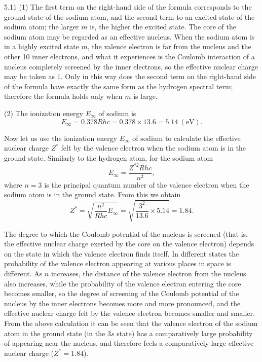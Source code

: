 \begin{solution}{5.11}
(1) The first term on the right-hand side of the formula corresponds to the ground state of the
sodium atom, and the second term to an excited state of the sodium atom; the larger $m$ is, the
higher the excited state. The core of the sodium atom may be regarded as an effective nucleus.
When the sodium atom is in a highly excited state $m$, the valence electron is far from the
nucleus and the other 10 inner electrons, and what it experiences is the Coulomb interaction of
a nucleus completely screened by the inner electrons, so the effective nuclear charge may be
taken as 1. Only in this way does the second term on the right-hand side of the formula have
exactly the same form as the hydrogen spectral term; therefore the formula holds only when $m$
is large.

(2) The ionization energy $E_\infty$ of sodium is
\begin{equation*}
E_\infty=0.378Rhc=0.378\times 13.6=5.14\ (\mathrm{eV}).
\end{equation*}

\begin{commentary}
Now let us use the ionization energy $E_\infty$ of sodium to calculate the effective nuclear
charge $Z^*$ felt by the valence electron when the sodium atom is in the ground state. Similarly
to the hydrogen atom, for the sodium atom
\begin{equation*}
E_\infty=\frac{Z^{*2}Rhc}{n^2},
\end{equation*}
where $n=3$ is the principal quantum number of the valence electron when the sodium atom is in
the ground state. From this we obtain
\begin{equation*}
Z^*=\sqrt{\frac{n^2}{Rhc}E_\infty}=\sqrt{\frac{3^2}{13.6}\times 5.14}=1.84.
\end{equation*}

The degree to which the Coulomb potential of the nucleus is screened (that is, the effective
nuclear charge exerted by the core on the valence electron) depends on the state in which the
valence electron finds itself. In different states the probability of the valence electron
appearing at various places in space is different. As $n$ increases, the distance of the valence
electron from the nucleus also increases, while the probability of the valence electron entering
the core becomes smaller, so the degree of screening of the Coulomb potential of the nucleus by
the inner electrons becomes more and more
pronounced, and the effective nuclear charge felt by the valence electron becomes smaller and
smaller. From the above calculation it can be seen that the valence electron of the sodium atom
in the ground state (in the $3s$ state) has a comparatively large probability of appearing near
the nucleus, and therefore feels a comparatively large effective nuclear charge
($Z^*=1.84$).
\end{commentary}
\end{solution}

